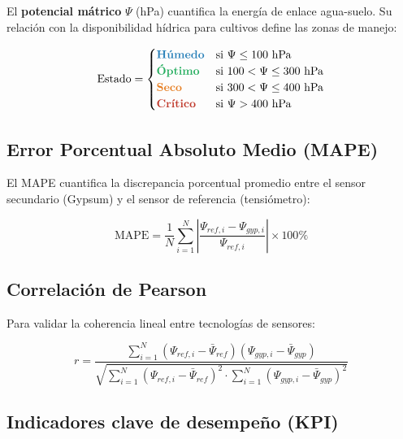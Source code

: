 \documentclass[12pt,a4paper]{article}
\begin{document}
El \textbf{potencial mátrico} $\Psi$ (hPa) cuantifica la energía de enlace agua-suelo. Su relación con la disponibilidad hídrica para cultivos define las zonas de manejo:

\begin{equation}
\text{Estado} = \begin{cases}
\textcolor{azulPrimario}{\textbf{Húmedo}} & \text{si } \Psi \leq 100 \text{ hPa} \\
\textcolor{verdeKPI}{\textbf{Óptimo}} & \text{si } 100 < \Psi \leq 300 \text{ hPa} \\
\textcolor{naranjaMeta}{\textbf{Seco}} & \text{si } 300 < \Psi \leq 400 \text{ hPa} \\
\textcolor{rojoKPI}{\textbf{Crítico}} & \text{si } \Psi > 400 \text{ hPa}
\end{cases}
\label{eq:estados}
\end{equation}

\subsection{Error Porcentual Absoluto Medio (MAPE)}

El MAPE cuantifica la discrepancia porcentual promedio entre el sensor secundario (Gypsum) y el sensor de referencia (tensiómetro):

\begin{equation}
\text{MAPE} = \frac{1}{N} \sum_{i=1}^{N} \left| \frac{\Psi_{ref,i} - \Psi_{gyp,i}}{\Psi_{ref,i}} \right| \times 100\%
\label{eq:mape}
\end{equation}

\subsection{Correlación de Pearson}

Para validar la coherencia lineal entre tecnologías de sensores:

\begin{equation}
r = \frac{\sum_{i=1}^{N}(\Psi_{ref,i} - \bar{\Psi}_{ref})(\Psi_{gyp,i} - \bar{\Psi}_{gyp})}{\sqrt{\sum_{i=1}^{N}(\Psi_{ref,i} - \bar{\Psi}_{ref})^2 \cdot \sum_{i=1}^{N}(\Psi_{gyp,i} - \bar{\Psi}_{gyp})^2}}
\label{eq:pearson}
\end{equation}

\subsection{Indicadores clave de desempeño (KPI)}
\end{document}
